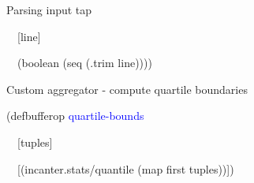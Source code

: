 \documentclass{beamer}
\begin{document}
\begin{frame}[allowframebreaks]{Parsing input tap}
\begin{small}
{\ttfamily\color{black}
\ \ [line]}

{\ttfamily\color{black}
\ \ \textcolor[rgb]{0.54901963,0.54901963,0.54901963}{(}\textcolor[rgb]{0.28235295,0.23921569,0.54509807}{boolean}
\textcolor[rgb]{0.54901963,0.54901963,0.54901963}{(}\textcolor[rgb]{0.28235295,0.23921569,0.54509807}{seq}
\textcolor[rgb]{0.54901963,0.54901963,0.54901963}{(}\textcolor[rgb]{0.28235295,0.23921569,0.54509807}{.trim}
line\textcolor[rgb]{0.54901963,0.54901963,0.54901963}{))))}}
\end{small}
\end{frame}


\begin{frame}{Custom aggregator - compute quartile boundaries}
\begin{small}
{\ttfamily\color{black}
\textcolor[rgb]{0.54901963,0.54901963,0.54901963}{(}\textcolor[rgb]{0.49803922,0.0,0.49803922}{defbufferop}
\textcolor{blue}{quartile-bounds}}

{\ttfamily\color{black}
\ \ [tuples]}

{\ttfamily\color{black}
\ \ [\textcolor[rgb]{0.54901963,0.54901963,0.54901963}{(}incanter.stats/quantile
\textcolor[rgb]{0.54901963,0.54901963,0.54901963}{(}\textcolor[rgb]{0.28235295,0.23921569,0.54509807}{map}
first
tuples\textcolor[rgb]{0.54901963,0.54901963,0.54901963}{))}]\textcolor[rgb]{0.54901963,0.54901963,0.54901963}{)}}
\end{small}
\end{frame}
\end{document}
